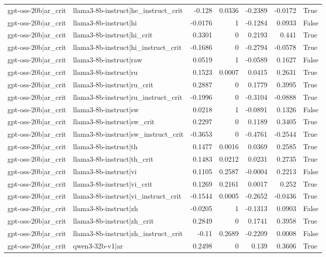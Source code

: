 \begin{table}
\begin{tabular}{l l r r r r l}
gpt-oss-20b|ar_crit & llama3-8b-instruct|he_instruct_crit & -0.128 & 0.0336 & -0.2389 & -0.0172 & True \\
gpt-oss-20b|ar_crit & llama3-8b-instruct|hi & -0.0176 & 1 & -0.1284 & 0.0933 & False \\
gpt-oss-20b|ar_crit & llama3-8b-instruct|hi_crit & 0.3301 & 0 & 0.2193 & 0.441 & True \\
gpt-oss-20b|ar_crit & llama3-8b-instruct|hi_instruct_crit & -0.1686 & 0 & -0.2794 & -0.0578 & True \\
gpt-oss-20b|ar_crit & llama3-8b-instruct|raw & 0.0519 & 1 & -0.0589 & 0.1627 & False \\
gpt-oss-20b|ar_crit & llama3-8b-instruct|ru & 0.1523 & 0.0007 & 0.0415 & 0.2631 & True \\
gpt-oss-20b|ar_crit & llama3-8b-instruct|ru_crit & 0.2887 & 0 & 0.1779 & 0.3995 & True \\
gpt-oss-20b|ar_crit & llama3-8b-instruct|ru_instruct_crit & -0.1996 & 0 & -0.3104 & -0.0888 & True \\
gpt-oss-20b|ar_crit & llama3-8b-instruct|sw & 0.0218 & 1 & -0.0891 & 0.1326 & False \\
gpt-oss-20b|ar_crit & llama3-8b-instruct|sw_crit & 0.2297 & 0 & 0.1189 & 0.3405 & True \\
gpt-oss-20b|ar_crit & llama3-8b-instruct|sw_instruct_crit & -0.3653 & 0 & -0.4761 & -0.2544 & True \\
gpt-oss-20b|ar_crit & llama3-8b-instruct|th & 0.1477 & 0.0016 & 0.0369 & 0.2585 & True \\
gpt-oss-20b|ar_crit & llama3-8b-instruct|th_crit & 0.1483 & 0.0212 & 0.0231 & 0.2735 & True \\
gpt-oss-20b|ar_crit & llama3-8b-instruct|vi & 0.1105 & 0.2587 & -0.0004 & 0.2213 & False \\
gpt-oss-20b|ar_crit & llama3-8b-instruct|vi_crit & 0.1269 & 0.2161 & 0.0017 & 0.252 & True \\
gpt-oss-20b|ar_crit & llama3-8b-instruct|vi_instruct_crit & -0.1544 & 0.0005 & -0.2652 & -0.0436 & True \\
gpt-oss-20b|ar_crit & llama3-8b-instruct|zh & -0.0205 & 1 & -0.1313 & 0.0903 & False \\
gpt-oss-20b|ar_crit & llama3-8b-instruct|zh_crit & 0.2849 & 0 & 0.1741 & 0.3958 & True \\
gpt-oss-20b|ar_crit & llama3-8b-instruct|zh_instruct_crit & -0.11 & 0.2689 & -0.2209 & 0.0008 & False \\
gpt-oss-20b|ar_crit & qwen3-32b-v1|ar & 0.2498 & 0 & 0.139 & 0.3606 & True \\

\end{tabular}
\end{table}
